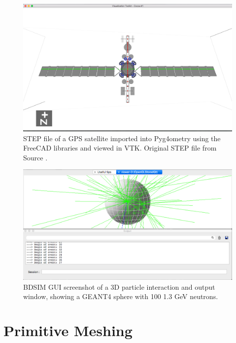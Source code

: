 \documentclass[12pt,a4paper]{article}
\begin{document}
\begin{figure}[h!]
\centering
\includegraphics[scale=0.4]{Images//VTK/sat.png}
\caption[width=\columnwidth]{STEP file of a GPS satellite imported into Pyg4ometry using the FreeCAD libraries and viewed in VTK. Original STEP file from Source \cite{sat}.}
\label{sat}
\end{figure}

\begin{figure}[h!]
\centering
\includegraphics[scale=0.4]{Images//BDSIM//screengrab.png}
\caption[width=\columnwidth]{BDSIM GUI screenshot of a 3D particle interaction and output window, showing a GEANT4 sphere with 100 1.3 GeV neutrons.}
\label{screengrab}
\end{figure}



\newpage
\section{Primitive Meshing}
\label{prim}
\end{document}
